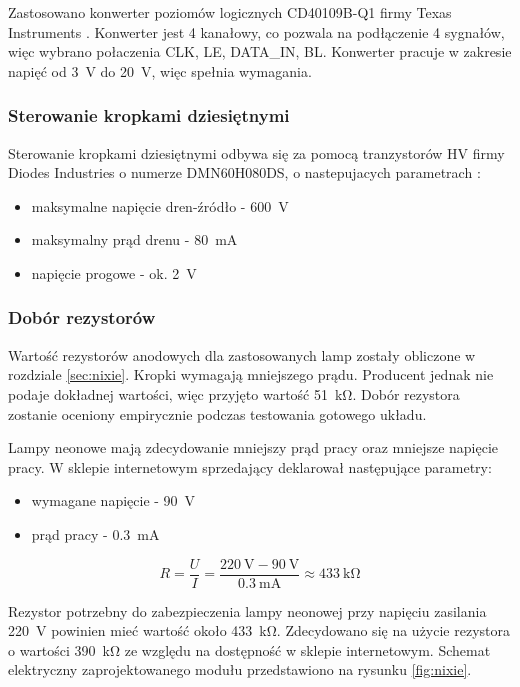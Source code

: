 \documentclass[../../main.tex]{subfiles}
\begin{document}
Zastosowano konwerter poziomów logicznych CD40109B-Q1 firmy Texas Instruments \cite{st:konwerter}.
Konwerter jest 4 kanałowy, co pozwala na podłączenie 4 sygnałów, więc wybrano połaczenia
CLK, LE, DATA\_IN, BL. Konwerter pracuje w zakresie napięć od \SI{3}{\volt} do \SI{20}{\volt}, więc spełnia wymagania.

\subsubsection{Sterowanie kropkami dziesiętnymi}
Sterowanie kropkami dziesiętnymi odbywa się za pomocą tranzystorów HV firmy Diodes Industries o numerze DMN60H080DS, 
o nastepujacych parametrach \cite{st:rejestry}:
\begin{itemize}
    \item maksymalne napięcie dren-źródło - \SI{600}{\volt}
    \item maksymalny prąd drenu - \SI{80}{\milli\ampere}
    \item napięcie progowe - ok. \SI{2}{\volt}
\end{itemize}

\subsubsection{Dobór rezystorów}
Wartość rezystorów anodowych dla zastosowanych lamp zostały obliczone w rozdziale \ref{sec:nixie}.
Kropki wymagają mniejszego prądu. Producent jednak nie podaje dokładnej wartości, więc przyjęto wartość \SI{51}{\kilo\ohm}.
Dobór rezystora zostanie oceniony empirycznie podczas testowania gotowego układu.

Lampy neonowe mają zdecydowanie mniejszy prąd pracy oraz mniejsze napięcie pracy. W sklepie internetowym sprzedający deklarował następujące parametry:
\begin{itemize}
    \item wymagane napięcie - \SI{90}{\volt}
    \item prąd pracy - \SI{0.3}{\milli\ampere}
\end{itemize}

\begin{equation}
    R = \frac{U}{I} = \frac{\SI{220}{\volt} - \SI{90}{\volt}}{ \SI{0.3}{\milli\ampere}} \approx \SI{433}{\kilo\ohm}
\end{equation}

Rezystor potrzebny do zabezpieczenia lampy neonowej przy napięciu zasilania \SI{220}{\volt} powinien mieć wartość około \SI{433}{\kilo\ohm}.
Zdecydowano się na użycie rezystora o wartości \SI{390}{\kilo\ohm} ze względu na dostępność w sklepie internetowym. 
Schemat elektryczny zaprojektowanego modułu przedstawiono na rysunku \ref{fig:nixie}.
\end{document}
